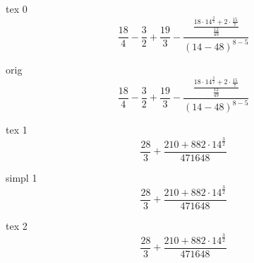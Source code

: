 \documentclass[a4paper, 12pt]{article}
\begin{document}
                          
tex 0 \[ {{{ \frac {{18}} {{4}} -  \frac {{3}} {{2}}} +  \frac {{19}} {{3}}} -  \frac { \frac {{{{18} \cdot {{14} ^  \frac {{3}} {{2}}}} + {{2} \cdot  \frac {{15}} {{7}}}}} { \frac {{12}} {{49}}}} {{\left({{14} - {48}}\right) ^ {{8} - {5}}}}} \]

orig \[ {{{ \frac {{18}} {{4}} -  \frac {{3}} {{2}}} +  \frac {{19}} {{3}}} -  \frac { \frac {{{{18} \cdot {{14} ^  \frac {{3}} {{2}}}} + {{2} \cdot  \frac {{15}} {{7}}}}} { \frac {{12}} {{49}}}} {{\left({{14} - {48}}\right) ^ {{8} - {5}}}}} \]

tex 1 \[ { \frac {{28}} {{3}} +  \frac {{{210} + {{882} \cdot {{14} ^  \frac {{3}} {{2}}}}}} {{471648}}} \]

simpl 1 \[ { \frac {{28}} {{3}} +  \frac {{{210} + {{882} \cdot {{14} ^  \frac {{3}} {{2}}}}}} {{471648}}} \]

tex 2 \[ { \frac {{28}} {{3}} +  \frac {{{210} + {{882} \cdot {{14} ^  \frac {{3}} {{2}}}}}} {{471648}}} \]
\end{document}
